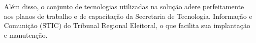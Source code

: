 Além disso, o conjunto de tecnologias utilizadas na solução adere perfeitamente aos planos de trabalho e de capacitação da Secretaria de Tecnologia, Informação e Comunição (STIC) do Tribunal Regional Eleitoral, o que facilita sua implantação e manutenção.

